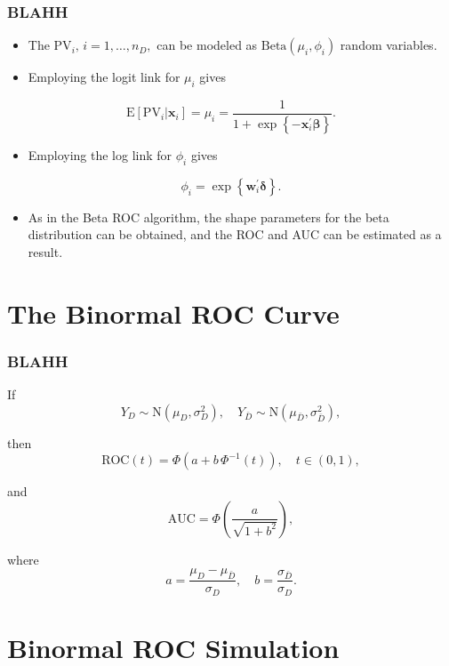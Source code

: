 \documentclass[t]{beamer}
\newcommand{\matr}[1]{\mathbf{#1}}
\begin{document}
\begin{frame}
	\frametitle{BLAHH}
	\begin{itemize}
		\item The $\text{PV}_i, \, i = 1, \dots, n_{D},$ can be modeled as $\text{Beta}(\mu_i, \phi_i)$ random variables.
		\item Employing the logit link for $\mu_i$ gives
	\end{itemize}
$$\text{E}[\text{PV}_i|\matr{x}_i] = \mu_i = \frac{1}{1 + \exp\left\{-\matr{x}_i^{\prime}\bm{\beta}\right\}}.$$
\vspace{-.2in}
	\begin{itemize}
		\item Employing the log link for $\phi_i$ gives
	\end{itemize}
$$\phi_i = \exp\left\{\matr{w}_i^{\prime}\bm{\delta}\right\}.$$
\vspace{-.2in}
\begin{itemize}
	\item As in the Beta ROC algorithm, the shape parameters for the beta distribution can be obtained, and the ROC and AUC can be estimated as a result.
\end{itemize}
\end{frame}

\section{The Binormal ROC Curve}

\begin{frame}
	\frametitle{BLAHH}
If 
$$Y_D \sim \text{N}(\mu_D, \sigma^2_D), \quad Y_{\bar{D}} \sim \text{N}(\mu_{\bar{D}}, \sigma^2_{\bar{D}}),$$

then
$$\text{ROC}(t) = \Phi(a + b\,\Phi^{-1}(t)), \quad t \in (0, 1),$$

and
$$\text{AUC} = \Phi\left(\frac{a}{\sqrt{1 + b^2}}\right),$$
	
where
$$a = \frac{\mu_D - \mu_{\bar{D}}}{\sigma_D}, \quad b = \frac{\sigma_{\bar{D}}}{\sigma_{D}}.$$
\end{frame}

\section{Binormal ROC Simulation}
\end{document}
